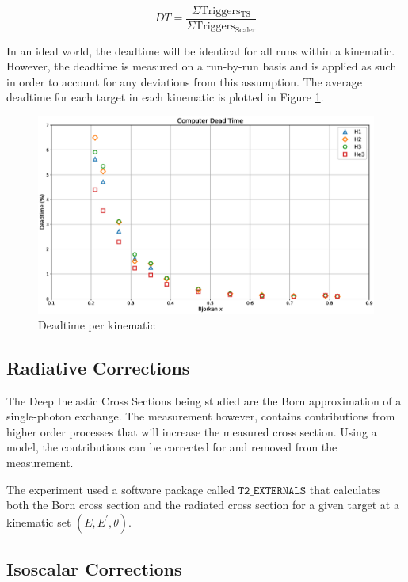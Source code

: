 \begin{equation}
DT = \frac{\Sigma \mathrm{Triggers_{TS}}}{\Sigma \mathrm{Triggers_{Scaler}}}
\end{equation}

In an ideal world, the deadtime will be identical for all runs within a kinematic. However, the deadtime is measured on a run-by-run basis and is applied as such in order to account for any deviations from this assumption. The average deadtime for each target in each kinematic is plotted in Figure \ref{fig:deadtime}.

\begin{figure}
	\includegraphics[width=\textwidth]{./analysis/fig/deadtime.eps}
	\caption{Deadtime per kinematic}
	\label{fig:deadtime}
\end{figure}

\subsection{Radiative Corrections}

The Deep Inelastic Cross Sections being studied are the Born approximation of a single-photon exchange. The measurement however, contains contributions from higher order processes that will increase the measured cross section. Using a model, the contributions can be corrected for and removed from the measurement.

The experiment used a software package called $\texttt{T2\_EXTERNALS}$ that calculates both the Born cross section and the radiated cross section for a given target at a kinematic set $(E,E^{\prime} ,\theta )$.

\subsection{Isoscalar Corrections}

